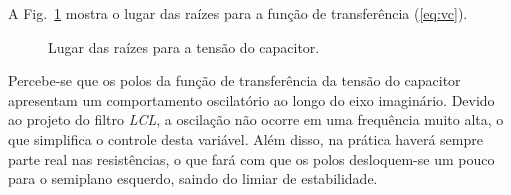 
    A Fig.~\ref{fig:rlocus_vc} mostra o lugar das raízes para a função de
    transferência (\ref{eq:vc}).

    \begin{figure}[htb]
        \renewcommand\figurename{Fig.}
        \caption{Lugar das raízes para a tensão do capacitor.}
        \label{fig:rlocus_vc}
    \end{figure}

    Percebe-se que os polos da função de transferência da tensão do capacitor
    apresentam um comportamento oscilatório ao longo do eixo imaginário. Devido
    ao projeto do filtro \textit{LCL}, a oscilação não ocorre em uma frequência
    muito alta, o que simplifica o controle desta variável. Além disso, na prática
    haverá sempre parte real nas resistências, o que fará com que os polos desloquem-se
    um pouco para o semiplano esquerdo, saindo do limiar de estabilidade.

